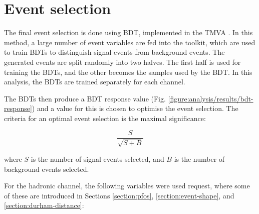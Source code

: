 \section{Event selection}
The final event selection is done using \acrlong{BDT}, implemented in the \acrfull{TMVA} \cite{tmva}. In this method, a large number of event variables are fed into the toolkit, which are used to train \acrshort{BDT}s to distinguish signal events from background events. The generated events are split randomly into two halves. The first half is used for training the \acrshort{BDT}s, and the other becomes the samples used by the \acrshort{BDT}. In this analysis, the \acrshort{BDT}s are trained separately for each channel. %

The \acrshort{BDT}s then produce a \acrshort{BDT} response value (Fig. \ref{figure:analysis/results/bdt-response}) and a value for this is chosen to optimise the event selection. The criteria for an optimal event selection is the maximal significance:

\begin{equation}
	\frac{S}{\sqrt{S + B}}
\label{eq:significance}
\end{equation}

where $S$ is the number of signal events selected, and $B$ is the number of background events selected.

For the hadronic channel, the following variables were used request, where some of these are introduced in Sections \ref{section:pfos}, \ref{section:event-shape}, and \ref{section:durham-distance}:

